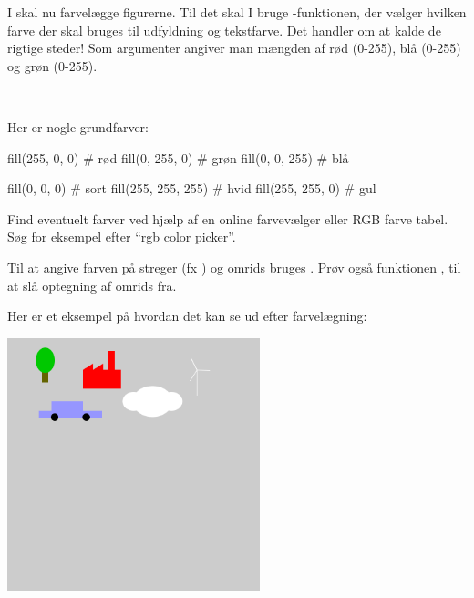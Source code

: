 \documentclass{ucph-handout}
\begin{document}
\begin{exercisebox}[adjusted title=Farver]
I skal nu farvelægge figurerne. Til det skal I bruge
-funktionen, der vælger hvilken farve der skal
bruges til udfyldning og tekstfarve. Det handler om at kalde
 de rigtige steder! Som argumenter angiver man mængden
af rød (0-255), blå (0-255) og grøn (0-255).

~

\noindent
Her er nogle grundfarver:

\begin{minipage}{0.45\linewidth}
\begin{python}
fill(255, 0, 0)  # rød
fill(0, 255, 0)  # grøn
fill(0, 0, 255)  # blå
\end{python}
\end{minipage}
\begin{minipage}{0.45\linewidth}
\begin{python}
fill(0, 0, 0)       # sort
fill(255, 255, 255) # hvid
fill(255, 255, 0)   # gul
\end{python}
\end{minipage}

Find eventuelt farver ved hjælp af en online farvevælger eller RGB
farve tabel. Søg for eksempel efter ``rgb color picker''.

\vspace{2mm}

Til at angive farven på streger (fx ) og omrids
bruges . Prøv også funktionen ,
til at slå optegning af omrids fra.
\end{exercisebox}

\newpage
\begin{exercisebox}[adjusted title=Eksempel]
Her er et eksempel på hvordan det kan se ud efter farvelægning:
\vspace{1mm}
\begin{center}
\includegraphics[width=0.55\textwidth]{../illustrations/images/farvelagt.png}
\end{center}
\vspace{-1mm}
\end{exercisebox}
\end{document}
